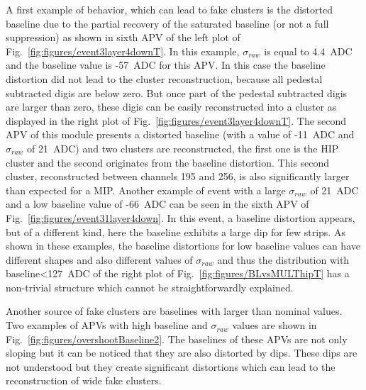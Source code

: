 A first example of behavior, which can lead to fake clusters is the distorted baseline due to the partial recovery of the saturated baseline (or not a full suppression) as shown in sixth APV of the left plot of Fig.~\ref{fig:figures/event3layer4downT}. In this example, $\sigma_{raw}$ is equal to 4.4~ADC and the baseline value is -57~ADC for this APV. In this case the baseline distortion did not lead to the cluster reconstruction, because all pedestal subtracted digis are below zero. But once part of the pedestal subtracted digis are larger than zero, these digis can be easily reconstructed into a cluster as displayed in the right plot of  Fig.~\ref{fig:figures/event3layer4downT}. The second APV of this module presents a distorted baseline (with a value of -11~ADC and $\sigma_{raw}$ of 21~ADC) and two clusters are reconstructed, the first one is the HIP cluster and the second originates from the baseline distortion. This second cluster, reconstructed between channels 195 and 256, is also significantly larger than expected for a MIP. Another example of event with a large $\sigma_{raw}$ of 21~ADC and a low baseline value of -66~ADC can be seen in the sixth APV of Fig.~\ref{fig:figures/event31layer4down}. In this event, a baseline distortion appears, but of a different kind, here the baseline exhibits a large dip for few strips. As shown in these examples, the baseline distortions for low baseline values can have different shapes and also different values of $\sigma_{raw}$ and thus the distribution with baseline<127~ADC of the right plot of Fig.~\ref{fig:figures/BLvsMULThipT} has a non-trivial structure which cannot be straightforwardly explained. 

Another source of fake clusters are baselines with larger than nominal values. Two examples of APVs with high baseline and $\sigma_{raw}$ values are shown in Fig.~\ref{fig:figures/overshootBaseline2}. The baselines of these APVs are not only sloping but it can be noticed that they are also distorted by dips. These dips are not understood but they create significant distortions which can lead to the reconstruction of wide fake clusters.



